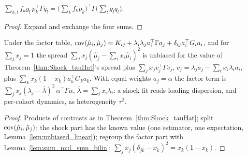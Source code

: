 \begin{lemma}\label{lem:sum_mul_sum_bilin}
  \leanok
  $\sum_{k,l} f_kg_l\,p_k^\top\Gamma q_l = \bigl(\sum_k f_kp_k\bigr)^\top\Gamma\bigl(\sum_l g_lq_l\bigr)$.
\end{lemma}
\begin{proof}
  \leanok
  Expand and exchange the four sums.
\end{proof}

\begin{theorem}\label{thm:Factor_between}
  \leanok
  Under the factor table, $\operatorname{cov}(\hat\mu_i, \hat\mu_j) = K_{ij} + \lambda_i\lambda_j a_i^\top\Gamma a_j
  + \delta_{ij}a_i^\top G_ia_i$, and for $\sum_j x_j = 1$ the spread
  $\sum_j x_j(\hat\mu_j - \sum_i x_i\hat\mu_i)^2$ is unbiased for the value of
  Theorem~\ref{thm:Shock_tauHat}'s spread plus $\sum_j x_j v_j^\top\Gamma v_j$,
  $v_j = \lambda_ja_j - \sum_i x_i\lambda_ia_i$, plus $\sum_k x_k(1-x_k)a_k^\top G_ka_k$. With
  equal weights $a_j = \alpha$ the factor term is
  $\sum_j x_j(\lambda_j - \bar\lambda)^2\,\alpha^\top\Gamma\alpha$, $\bar\lambda = \sum_i x_i\lambda_i$:
  a shock fit reads loading dispersion, and per-cohort dynamics, as heterogeneity $\tau^2$.
\end{theorem}
\begin{proof}
  \leanok
  Products of contrasts as in Theorem~\ref{thm:Shock_tauHat}; split $\operatorname{cov}(\hat\mu_i,\hat\mu_j)$;
  the shock part has the known value (one estimator, one expectation,
  Lemma~\ref{lem:unbiased_linear}); regroup the factor part with
  Lemma~\ref{lem:sum_mul_sum_bilin}; $\sum_j x_j(\delta_{jk} - x_k)^2 = x_k(1 - x_k)$.
\end{proof}

